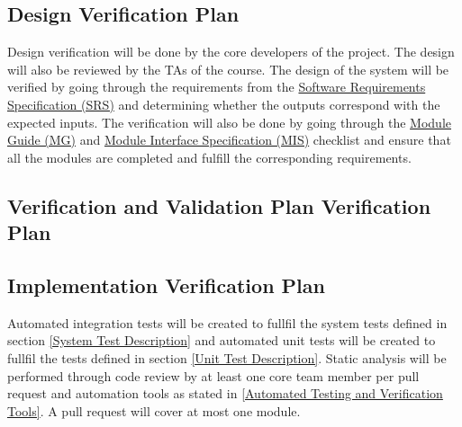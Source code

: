 \documentclass[12pt, titlepage]{article}
\begin{document}


\subsection{Design Verification Plan}

Design verification will be done by the core developers of the project. The design will also be
reviewed by the TAs of the course. The design of the system will be verified by going through the
requirements from the
\href{https://github.com/arkinmodi/project-sayyara/blob/main/docs/SRS/SRS.pdf}{Software
	Requirements Specification (SRS)} and determining whether the outputs correspond with the expected
inputs. The verification will also be done by going through the
\href{https://github.com/arkinmodi/project-sayyara/blob/main/docs/Design/MG/MG.pdf}{Module Guide
	(MG)} and
\href{https://github.com/arkinmodi/project-sayyara/blob/main/docs/Design/MIS/MIS.pdf}{Module
	Interface Specification (MIS)} checklist and ensure that all the modules are completed and fulfill
the corresponding requirements.

\subsection{Verification and Validation Plan Verification Plan}




\subsection{Implementation Verification Plan}

Automated integration tests will be created to fullfil the system tests defined in section
\ref{System Test Description} and automated unit tests will be created to fullfil the tests defined
in section \ref{Unit Test Description}. Static analysis will be performed through code review by at
least one core team member per pull request and automation tools as stated in \ref{Automated
	Testing and Verification Tools}. A pull request will cover at most one module.
\end{document}
